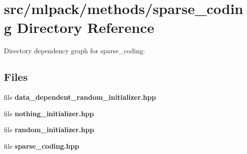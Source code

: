 \section{src/mlpack/methods/sparse\-\_\-coding Directory Reference}
\label{dir_cd908bff38ffecff7035ca82eb652826}
Directory dependency graph for sparse\-\_\-coding\-:
\subsection*{Files}
\begin{DoxyCompactItemize}
\item 
file {\bf data\-\_\-dependent\-\_\-random\-\_\-initializer.\-hpp}
\item 
file {\bf nothing\-\_\-initializer.\-hpp}
\item 
file {\bf random\-\_\-initializer.\-hpp}
\item 
file {\bf sparse\-\_\-coding.\-hpp}
\end{DoxyCompactItemize}
